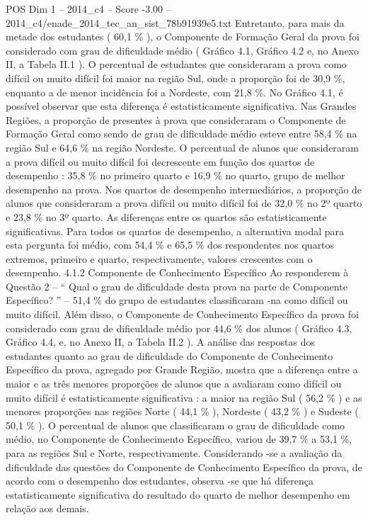 \begin{textsample}{POS Dim 1 – 2014\_c4 – Score -3.00 – 2014\_c4/enade\_2014\_tec\_an\_sist\_78b91939e5.txt}
Entretanto, para mais da metade dos estudantes ( 60,1 \% ), o Componente de Formação Geral da prova foi considerado com grau de dificuldade médio ( Gráfico 4.1, Gráfico 4.2 e, no Anexo II, a Tabela II.1 ).
O percentual de estudantes que consideraram a prova como difícil ou muito difícil foi maior na região Sul, onde a proporção foi de 30,9 \%, enquanto a de menor incidência foi a Nordeste, com 21,8 \%.
No Gráfico 4.1, é possível observar que esta diferença é estatisticamente significativa.
Nas Grandes Regiões, a proporção de presentes à prova que consideraram o Componente de Formação Geral como sendo de grau de dificuldade médio esteve entre 58,4 \% na região Sul e 64,6 \% na região Nordeste.
O percentual de alunos que consideraram a prova difícil ou muito difícil foi decrescente em função dos quartos de desempenho : 35,8 \% no primeiro quarto e 16,9 \% no quarto, grupo de melhor desempenho na prova.
Nos quartos de desempenho intermediários, a proporção de alunos que consideraram a prova difícil ou muito difícil foi de 32,0 \% no 2º quarto e 23,8 \% no 3º quarto.
As diferenças entre os quartos são estatisticamente significativas.
Para todos os quartos de desempenho, a alternativa modal para esta pergunta foi médio, com 54,4 \% e 65,5 \% dos respondentes nos quartos extremos, primeiro e quarto, respectivamente, valores crescentes com o desempenho. 4.1.2 Componente de Conhecimento Específico Ao responderem à Questão 2 – “ Qual o grau de dificuldade desta prova na parte de Componente Específico? ” – 51,4 \% do grupo de estudantes classificaram -na como difícil ou muito difícil.
Além disso, o Componente de Conhecimento Específico da prova foi considerado com grau de dificuldade médio por 44,6 \% dos alunos ( Gráfico 4.3, Gráfico 4.4, e, no Anexo II, a Tabela II.2 ).
A análise das respostas dos estudantes quanto ao grau de dificuldade do Componente de Conhecimento Específico da prova, agregado por Grande Região, mostra que a diferença entre a maior e as três menores proporções de alunos que a avaliaram como difícil ou muito difícil é estatisticamente significativa : a maior na região Sul ( 56,2 \% ) e as menores proporções nas regiões Norte ( 44,1 \% ), Nordeste ( 43,2 \% ) e Sudeste ( 50,1 \% ).
O percentual de alunos que classificaram o grau de dificuldade como médio, no Componente de Conhecimento Específico, variou de 39,7 \% a 53,1 \%, para as regiões Sul e Norte, respectivamente.
Considerando -se a avaliação da dificuldade das questões do Componente de Conhecimento Específico da prova, de acordo com o desempenho dos estudantes, observa -se que há diferença estatisticamente significativa do resultado do quarto de melhor desempenho em relação aos demais.

\end{textsample}
